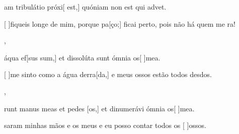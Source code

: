 {  {\item {}am tribulátio próxi[ est,] quóniam non est qui advet.}%
    {\item {}[ ]{fi}queis longe de mim, porque pa[ço;] ficai perto, pois não há quem me ra!},
  {\item {} áqua ef[sus sum,] et dissolúta sunt ómnia os[ ]{me}a.}%
    {\item {}[ ]{me} sinto como a água derra[da,] e meus ossos estão todos desdos.},
  {\item {}runt manus meas et pedes [os,] et dinumerávi ómnia os[ ]{me}a.}%
    {\item {}saram minhas mãos e os meus  e eu posso contar todos os [ ]{os}sos.}
}